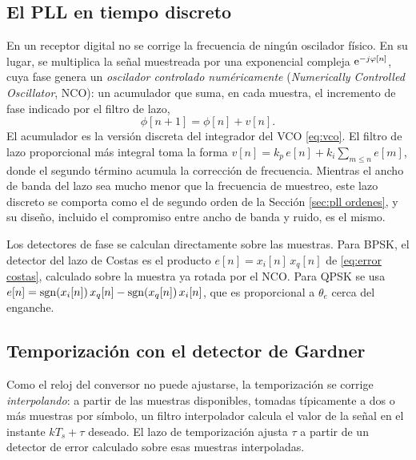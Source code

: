 \subsection{El PLL en tiempo discreto}\label{sec:pll discreto}

En un receptor digital no se corrige la frecuencia de ningún oscilador físico. En su lugar, se multiplica la señal muestreada por una exponencial compleja $\mathrm{e}^{-j\varphi[n]}$, cuya fase genera un \emph{oscilador controlado numéricamente} (\emph{Numerically Controlled Oscillator}, NCO): un acumulador que suma, en cada muestra, el incremento de fase indicado por el filtro de lazo,
\begin{equation*}
    \phi[n+1] = \phi[n] + v[n].
\end{equation*}
El acumulador es la versión discreta del integrador del VCO \eqref{eq:vco}. El filtro de lazo proporcional más integral toma la forma $v[n]=k_p\,e[n]+k_i\sum_{m\leqslant n}e[m]$, donde el segundo término acumula la corrección de frecuencia. Mientras el ancho de banda del lazo sea mucho menor que la frecuencia de muestreo, este lazo discreto se comporta como el de segundo orden de la Sección \ref{sec:pll ordenes}, y su diseño, incluido el compromiso entre ancho de banda y ruido, es el mismo.

Los detectores de fase se calculan directamente sobre las muestras. Para BPSK, el detector del lazo de Costas es el producto $e[n]=x_i[n]\,x_q[n]$ de \eqref{eq:error costas}, calculado sobre la muestra ya rotada por el NCO. Para QPSK se usa $e[n]=\operatorname{sgn}(x_i[n])\,x_q[n]-\operatorname{sgn}(x_q[n])\,x_i[n]$, que es proporcional a $\theta_e$ cerca del enganche.

\subsection{Temporización con el detector de Gardner}\label{sec:gardner}

Como el reloj del conversor no puede ajustarse, la temporización se corrige \emph{interpolando}: a partir de las muestras disponibles, tomadas típicamente a dos o más muestras por símbolo, un filtro interpolador calcula el valor de la señal en el instante $kT_s+\tau$ deseado. El lazo de temporización ajusta $\tau$ a partir de un detector de error calculado sobre esas muestras interpoladas.

